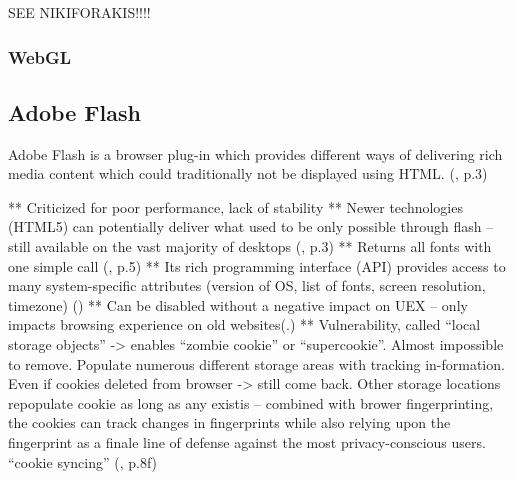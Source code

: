 SEE NIKIFORAKIS!!!!


\subsubsection{WebGL}


\subsection{Adobe Flash}
Adobe Flash is a browser plug-in which provides different ways of delivering rich media content which could traditionally not be displayed using HTML. (\textcite{nikiforakis13}, p.3)


**	Criticized for poor performance, lack of stability
**	Newer technologies (HTML5) can potentially deliver what used to be only possible through flash – still available on the vast majority of desktops (\textcite{nikiforakis13}, p.3)
**	Returns all fonts with one simple call (\textcite{havens16}, p.5)
**	Its rich programming interface (API) provides access to many system-specific attributes (version of OS, list of fonts, screen resolution, timezone) (\textcite{amiunique})
**	Can be disabled without a negative impact on UEX – only impacts browsing experience on old websites(\textcite{pixel18}.)
**	Vulnerability, called “local storage objects” -> enables “zombie cookie” or “supercookie”. Almost impossible to remove. Populate numerous different storage areas with tracking in-formation. Even if cookies deleted from browser -> still come back. Other storage locations repopulate cookie as long as any existis – combined with brower fingerprinting, the cookies can track changes in fingerprints while also relying upon the fingerprint as a finale line of defense against the most privacy-conscious users. “cookie syncing” (\textcite{havens16}, p.8f)

